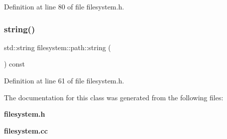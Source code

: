 Definition at line 80 of file filesystem.\+h.

\mbox{\label{classfilesystem_1_1path_a9d7a63336effb5466f7e24a7b0227865}} 
\subsubsection{string()}
{\footnotesize\ttfamily std\+::string filesystem\+::path\+::string (\begin{DoxyParamCaption}{ }\end{DoxyParamCaption}) const\hspace{0.3cm}{\ttfamily [inline]}}



Definition at line 61 of file filesystem.\+h.



The documentation for this class was generated from the following files\+:\begin{DoxyCompactItemize}
\item 
\textbf{ filesystem.\+h}\item 
\textbf{ filesystem.\+cc}\end{DoxyCompactItemize}
